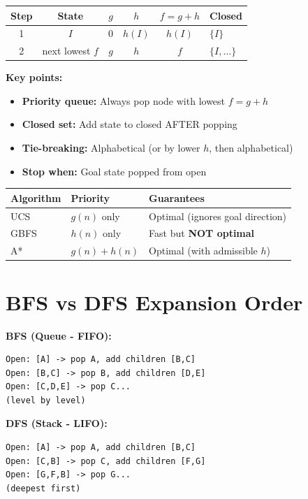 \documentclass[11pt,a4paper]{article}
\begin{document}
\begin{definitionbox}
\begin{center}
\begin{tabular}{|c|c|c|c|c|l|}
\hline
\textbf{Step} & \textbf{State} & $g$ & $h$ & $f = g + h$ & \textbf{Closed} \\
\hline
1 & $I$ & 0 & $h(I)$ & $h(I)$ & $\{I\}$ \\
2 & next lowest $f$ & $g$ & $h$ & $f$ & $\{I, \ldots\}$ \\
\hline
\end{tabular}
\end{center}

\textbf{Key points:}
\begin{itemize}[leftmargin=*,nosep]
\item \textbf{Priority queue:} Always pop node with lowest $f = g + h$
\item \textbf{Closed set:} Add state to closed AFTER popping
\item \textbf{Tie-breaking:} Alphabetical (or by lower $h$, then alphabetical)
\item \textbf{Stop when:} Goal state popped from open
\end{itemize}
\end{definitionbox}

\begin{warningbox}
\begin{center}
\begin{tabular}{@{}lll@{}}
\toprule
\textbf{Algorithm} & \textbf{Priority} & \textbf{Guarantees} \\
\midrule
UCS & $g(n)$ only & Optimal (ignores goal direction) \\
GBFS & $h(n)$ only & Fast but \textbf{NOT optimal} \\
A* & $g(n) + h(n)$ & Optimal (with admissible $h$) \\
\bottomrule
\end{tabular}
\end{center}
\end{warningbox}

\section{BFS vs DFS Expansion Order}

\begin{definitionbox}
\textbf{BFS (Queue - FIFO):}
\begin{verbatim}
Open: [A] -> pop A, add children [B,C]
Open: [B,C] -> pop B, add children [D,E]
Open: [C,D,E] -> pop C...
(level by level)
\end{verbatim}

\textbf{DFS (Stack - LIFO):}
\begin{verbatim}
Open: [A] -> pop A, add children [B,C]
Open: [C,B] -> pop C, add children [F,G]
Open: [G,F,B] -> pop G...
(deepest first)
\end{verbatim}
\end{definitionbox}
\end{document}

